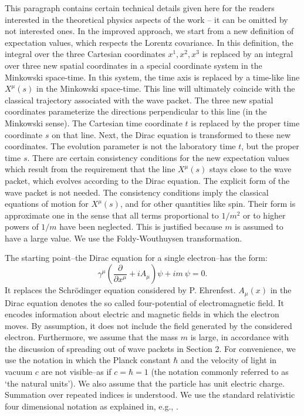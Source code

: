 \documentclass[12pt]{article}
\begin{document}
This paragraph contains certain technical details given here for the readers interested in the theoretical physics aspects of the work \cite{aro1}-- it can be omitted by not interested ones. In the improved approach, we start from a new definition of expectation values, which respects the Lorentz covariance. In this definition, the integral over the three Cartesian coordinates $x^1, x^2, x^3$ is replaced by an integral over 
three new spatial coordinates in a special coordinate system in the Minkowski space-time. In this system, the time axis is replaced by 
a time-like line $X^{\mu}(s)$ in the Minkowski space-time. This line will ultimately coincide with the classical trajectory associated with the wave packet. The three new spatial coordinates parameterize the directions perpendicular to this line (in the Minkowski sense).
The Cartesian time coordinate $t$ is replaced by the proper time coordinate $s$ on that line. Next, the Dirac equation is transformed to these new coordinates. The evolution parameter is not the laboratory time $t$, but the proper time $s$. There are certain consistency conditions for the new expectation values which result from the requirement that 
the line $X^{\mu}(s)$ stays close to the wave packet, which evolves according to the Dirac equation. The explicit form of the wave packet is not needed. The consistency conditions imply the classical 
equations of motion for $X^{\mu}(s)$, and for other quantities like spin. Their form is approximate one in the sense that all terms proportional to $1/m^2$ or to higher powers of $1/m$ have been neglected. This is justified because $m$ is assumed to have a large value. We use the Foldy-Wouthuysen transformation. 


The starting point--the Dirac equation for a single electron--has the form: 
\[ \gamma^{\mu} \left(\frac{\partial}{\partial x^{\mu}} + i A_{\mu}\right)\psi + i m \: \psi =0. \]
It replaces the Schr\"odinger equation considered by P. Ehrenfest. 
 $A_{\mu}(x)$ in the Dirac equation denotes the so called four-potential of electromagnetic field. It encodes information about electric and magnetic fields in which the electron moves. By assumption, it does not include the field generated by the considered electron. Furthermore, we assume that the mass $m$ is large, in accordance with the discussion of spreading out of wave packets in Section 2. For convenience, we use the notation in which the Planck constant $\hbar$ and the velocity of light in vacuum $c$ are not visible--as if $c=\hbar =1$ (the notation commonly referred to as `the natural units'). 
We also assume that the particle has unit electric charge. Summation over repeated indices is understood. We use the standard relativistic four dimensional notation as explained in, e.g., \cite{relat}. 
\end{document}
